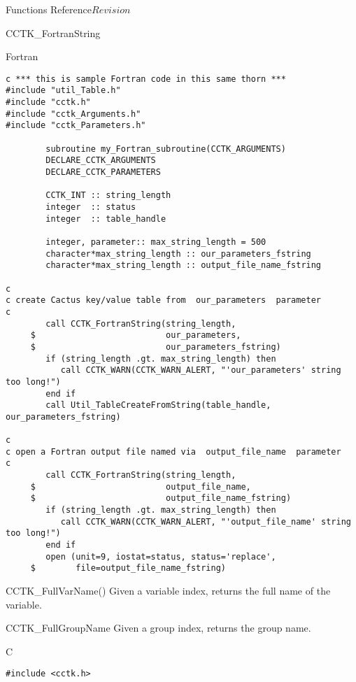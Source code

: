 \begin{cactuspart}{ Functions Reference}{}{$Revision$}
\begin{FunctionDescription}{CCTK\_FortranString}
\begin{ExampleSection}
\begin{Example}{Fortran}
\begin{verbatim}
c *** this is sample Fortran code in this same thorn ***
#include "util_Table.h"
#include "cctk.h"
#include "cctk_Arguments.h"
#include "cctk_Parameters.h"

        subroutine my_Fortran_subroutine(CCTK_ARGUMENTS)
        DECLARE_CCTK_ARGUMENTS
        DECLARE_CCTK_PARAMETERS

        CCTK_INT :: string_length
        integer  :: status
        integer  :: table_handle

        integer, parameter:: max_string_length = 500
        character*max_string_length :: our_parameters_fstring
        character*max_string_length :: output_file_name_fstring

c
c create Cactus key/value table from  our_parameters  parameter
c
        call CCTK_FortranString(string_length,
     $                          our_parameters,
     $                          our_parameters_fstring)
        if (string_length .gt. max_string_length) then
           call CCTK_WARN(CCTK_WARN_ALERT, "'our_parameters' string too long!")
        end if
        call Util_TableCreateFromString(table_handle, our_parameters_fstring)

c
c open a Fortran output file named via  output_file_name  parameter
c
        call CCTK_FortranString(string_length,
     $                          output_file_name,
     $                          output_file_name_fstring)
        if (string_length .gt. max_string_length) then
           call CCTK_WARN(CCTK_WARN_ALERT, "'output_file_name' string too long!")
        end if
        open (unit=9, iostat=status, status='replace',
     $        file=output_file_name_fstring)
\end{verbatim}
\end{Example}
\end{ExampleSection}
\begin{SeeAlsoSection}
\begin{SeeAlso}{CCTK\_FullVarName()}
Given a variable index, returns the full name of the variable.
\end{SeeAlso}
\end{SeeAlsoSection}
\end{FunctionDescription}


\begin{FunctionDescription}{CCTK\_FullGroupName}
\label{CCTK-FullGroupName}
Given a group index, returns the group name.

\begin{SynopsisSection}
\begin{Synopsis}{C}
\begin{verbatim}
#include <cctk.h>


\end{verbatim}
\end{Synopsis}
\end{SynopsisSection}
\end{FunctionDescription}
\end{cactuspart}
